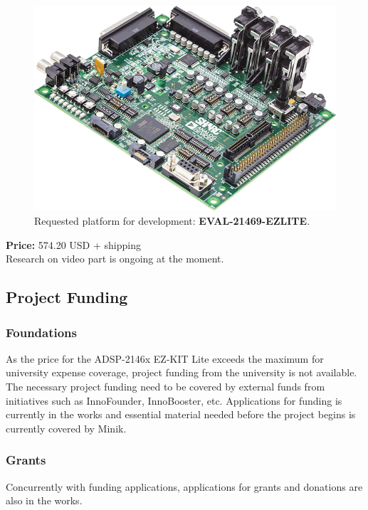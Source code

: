 \begin{figure}[H]
\centering
\includegraphics[scale=0.4]{./pictures/ADZS.png}
\caption{Requested platform for development: \textbf{EVAL-21469-EZLITE}.}
\label{fig:ADZS.png}
\end{figure}

\textbf{Price:} 574.20 USD + shipping \\ 

Research on video part is ongoing at the moment.

\subsection{Project Funding}
\subsubsection{Foundations}
As the price for the ADSP-2146x EZ-KIT Lite exceeds the maximum for university expense coverage, project funding from the university is not available. The necessary project funding need to be covered by external funds from initiatives such as InnoFounder, InnoBooster, etc. Applications for funding is currently in the works and essential material needed before the project begins is currently covered by Minik. \\

\subsubsection{Grants}
Concurrently with funding applications, applications for grants and donations are also in the works. \\

